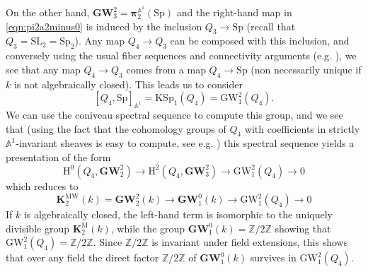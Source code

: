 \documentclass[11pt,leqno]{article}
\newcommand{\Z}{{\mathbb Z}}
\newcommand{\A}{{\mathbb A}}
\newcommand{\aone}{{\mathbb A}^1}
\renewcommand{\1}{{\rm 1\hspace*{-0.4ex}%
\rule{0.1ex}{1.52ex}\hspace*{0.2ex}}}
\newcommand{\MW}{\mathrm{MW}}
\newcommand{\bpi}{\bm{\pi}}
\newcommand{\piaone}{{\bpi}^{\aone}}
\newcommand{\KMW}[1]{{{\mathbf K}_{#1}^{\MW}}}
\newcommand{\<}[1]{{\langle}#1 {\rangle}}
\theoremstyle{plain}
\theoremstyle{definition}
\theoremstyle{remark}
\numberwithin{equation}{section}
\begin{document}
On the other hand, $\mathbf{GW}_3^2=\piaone_2(\mathrm{Sp})$ and the right-hand map in \eqref{eqn:pi2a2minus0} is induced by the inclusion $Q_3\to \mathrm{Sp}$ (recall that $Q_3 = \mathrm{SL}_2 = \mathrm{Sp}_2$). Any map $Q_4\to Q_3$ can be composed with this inclusion, and conversely using the usual fiber sequences and connectivity arguments (e.g. \cite[Corollary 2.4]{Asok12a}), we see that any map $Q_4\to Q_3$ comes from a map $Q_4\to \mathrm{Sp}$ (non necessarily unique if $k$ is not algebraically closed). This leads us to consider 
\[
[Q_4,\mathrm{Sp}]_{\aone}=\mathrm{KSp}_1(Q_4)=\mathrm{GW}^2_1(Q_4).
\]
We can use the coniveau spectral sequence \cite[Definition 26]{Fasel09c} to compute this group, and we see that (using the fact that the cohomology groups of $Q_4$ with coefficients in strictly $\A^1$-invariant sheaves is easy to compute, see e.g. \cite[Proposition 1.1.5]{Asok16}) this spectral sequence yields a presentation of the form
\[
\mathrm{H}^0(Q_4,\mathbf{GW}_2^2)\to \mathrm{H}^2(Q_4,\mathbf{GW}_3^2)\to \mathrm{GW}_1^2(Q_4)\to 0
\] 
which reduces to 
\[
\KMW2(k)=\mathbf{GW}_2^2(k)\to \mathbf{GW}_1^0(k)\to \mathrm{GW}_1^2(Q_4)\to 0
\] 
If $k$ is algebraically closed, the left-hand term is isomorphic to the uniquely divisible group $\mathbf{K}^{\mathrm{M}}_2(k)$, while the group $ \mathbf{GW}_1^0(k)=\Z/2\Z$ showing that $\mathrm{GW}_1^2(Q_4)=\Z/2\Z$. Since $\Z/2\Z$ is invariant under field extensions, this shows that over any field the direct factor $\Z/2\Z$ of $\mathbf{GW}_1^0(k)$ survives in $\mathrm{GW}_1^2(Q_4)$. 
\end{document}
